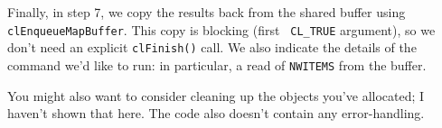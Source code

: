 Finally, in step 7, we copy the results back from the shared buffer
using {\tt clEnqueueMapBuffer}. This copy is blocking (first {\tt
  CL\_TRUE} argument), so we don't need an explicit {\tt clFinish()}
call. We also indicate the details of the command we'd like to
run: in particular, a read of {\tt NWITEMS} from the buffer.

You might also want to consider cleaning up the objects you've
allocated; I haven't shown that here. The code also doesn't contain
any error-handling.






